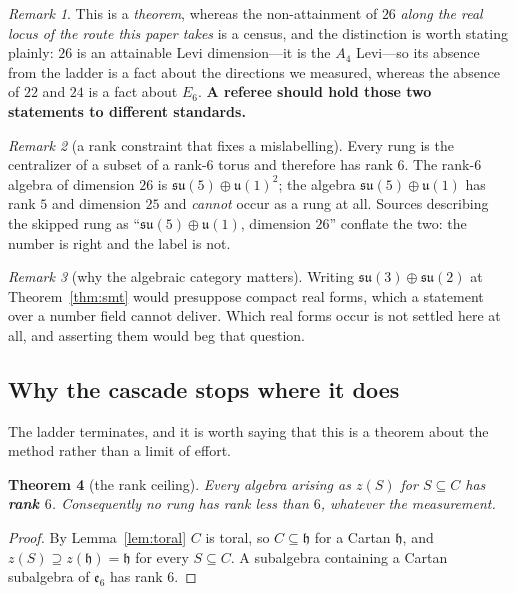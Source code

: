 \documentclass[11pt,reqno]{amsart}
\theoremstyle{plain}
\newtheorem{theorem}{Theorem}[section]
\theoremstyle{definition}
\theoremstyle{remark}
\newtheorem{remark}[theorem]{Remark}
\newcommand{\su}{\mathfrak{su}}
\newcommand{\uu}{\mathfrak{u}}
\newcommand{\ee}{\mathfrak{e}}
\newcommand{\h}{\mathfrak{h}}
\begin{document}
\begin{remark}
This is a \emph{theorem}, whereas the non-attainment of $26$ \emph{along the real
locus of the route this paper takes} is a census, and the
distinction is worth stating plainly: $26$ is an attainable Levi dimension---it is the
$A_4$ Levi---so its absence from the ladder is a fact about the directions we measured,
whereas the absence of $22$ and $24$ is a fact about $E_6$. \textbf{A referee should hold
those two statements to different standards.}
\end{remark}

\begin{remark}[a rank constraint that fixes a mislabelling]\label{rem:rank}
Every rung is the centralizer of a subset of a rank-$6$ torus and therefore has rank
$6$. The rank-$6$ algebra of dimension $26$ is $\su(5)\oplus\uu(1)^2$; the algebra
$\su(5)\oplus\uu(1)$ has rank $5$ and dimension $25$ and \emph{cannot} occur as a rung
at all. Sources describing the skipped rung as ``$\su(5)\oplus\uu(1)$, dimension $26$''
conflate the two: the number is right and the label is not.
\end{remark}

\begin{remark}[why the algebraic category matters]
Writing $\su(3)\oplus\su(2)$ at Theorem~\ref{thm:smt} would presuppose compact real
forms, which a statement over a number field cannot deliver. Which real forms occur is
not settled here at all, and asserting them would beg that question.
\end{remark}

\subsection{Why the cascade stops where it does}\label{sec:rankceiling}

The ladder terminates, and it is worth saying that this is a theorem about the method
rather than a limit of effort.

\begin{theorem}[the rank ceiling]\label{thm:rankceiling}
Every algebra arising as $z(S)$ for $S\subseteq C$ has \textbf{rank $6$}. Consequently no
rung has rank less than $6$, whatever the measurement.
\end{theorem}

\begin{proof}
By Lemma~\ref{lem:toral} $C$ is toral, so $C\subseteq\h$ for a Cartan $\h$, and
$z(S)\supseteq z(\h)=\h$ for every $S\subseteq C$. A subalgebra containing a Cartan
subalgebra of $\ee_6$ has rank $6$.
\end{proof}
\end{document}
